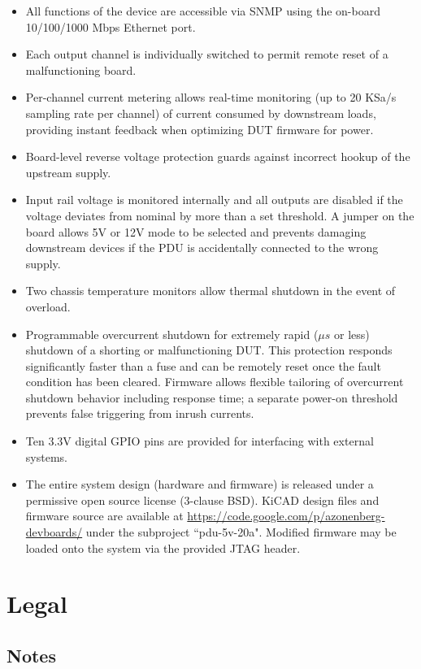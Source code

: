 \documentclass[twocolumn]{article}
\begin{document}
\begin{itemize}
\item All functions of the device are accessible via SNMP using the on-board 10/100/1000 Mbps Ethernet port.
\item Each output channel is individually switched to permit remote reset of a malfunctioning board.
\item Per-channel current metering allows real-time monitoring (up to 20 KSa/s sampling rate per channel) of current 
consumed by downstream loads, providing instant feedback when optimizing DUT firmware for power.
\item Board-level reverse voltage protection guards against incorrect hookup of the upstream supply.
\item Input rail voltage is monitored internally and all outputs are disabled if the voltage deviates from nominal by 
more than a set threshold. A jumper on the board allows 5V or 12V mode to be selected and prevents damaging downstream 
devices if the PDU is accidentally connected to the wrong supply.
\item Two chassis temperature monitors allow thermal shutdown in the event of overload.
\item Programmable overcurrent shutdown for extremely rapid ($\mu s$ or less) shutdown of a shorting or malfunctioning
DUT. This protection responds significantly faster than a fuse and can be remotely reset once the fault condition has 
been cleared. Firmware allows flexible tailoring of overcurrent shutdown behavior including response time; a separate 
power-on threshold prevents false triggering from inrush currents.
\item Ten 3.3V  digital GPIO pins are provided for interfacing with external systems.
\item The entire system design (hardware and firmware) is released under a permissive open source license (3-clause
BSD). KiCAD design files and firmware source are available at \url{https://code.google.com/p/azonenberg-devboards/}
under the  subproject ``pdu-5v-20a". Modified firmware may be loaded onto the system via the provided JTAG header.
\end{itemize}

\section{Legal}

\subsection{Notes}
\end{document}
